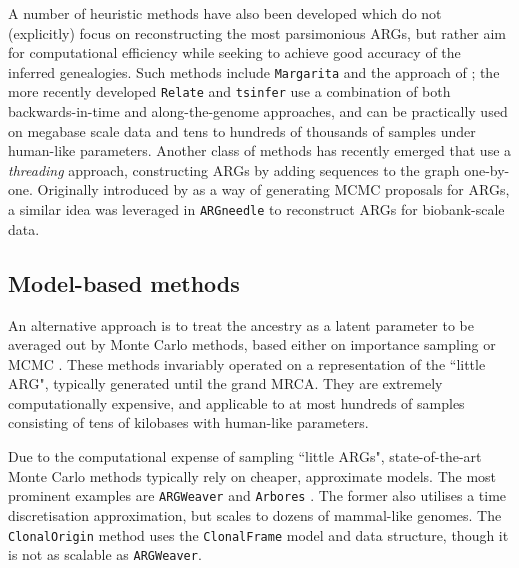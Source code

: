 \documentclass{article}
\begin{document}
A number of heuristic methods have also been developed which do not (explicitly) focus on reconstructing
the most parsimonious ARGs, but rather aim for computational efficiency while seeking to achieve good
accuracy of the inferred genealogies. Such methods include \texttt{Margarita} \citep{minichiello2006mapping}
and the approach of \citet{parida2008estimating}; the more recently developed \texttt{Relate}
\citep{speidel2019method} and \texttt{tsinfer} \citep{kelleher2019inferring} use a combination of both
backwards-in-time and along-the-genome approaches, and can be practically used on megabase scale data
and tens to hundreds of thousands of samples under human-like parameters.
Another class of methods has recently emerged that use a \emph{threading} approach, constructing ARGs
by adding sequences to the graph one-by-one. Originally introduced by \citet{rasmussen2014genome} as a
way of generating MCMC proposals for ARGs, a similar idea was leveraged in \texttt{ARGneedle}
\citep{zhang2021biobank} to reconstruct ARGs for biobank-scale data.

\subsection*{Model-based methods}
An alternative approach is to treat the ancestry as a latent parameter to be averaged out
by Monte Carlo methods, based either on importance sampling
\citep{griffiths1996ancestral, fearnhead2001estimating, jenkins2011inference}
or MCMC \citep{kuhner2000maximum, nielsen2000estimation, wang2008bayesian, fallon2013acg}.
These methods invariably operated on a representation of the ``little ARG", typically
generated until the grand MRCA. They are extremely computationally expensive,
and applicable to at most hundreds of samples consisting of tens of kilobases with
human-like parameters.

Due to the computational expense of sampling ``little ARGs", state-of-the-art
Monte Carlo methods typically rely on cheaper, approximate models.
The most prominent examples are \texttt{ARGWeaver} \citep{rasmussen2014genome}
and \texttt{Arbores} \citep{heine2018bridging}. The former also utilises a time
discretisation approximation, but scales to dozens of mammal-like genomes.
The \texttt{ClonalOrigin} method \citep{didelot2010inference,
medina2020speeding} uses the \texttt{ClonalFrame}
model and data structure, though it is not as scalable as \texttt{ARGWeaver}.
\end{document}
